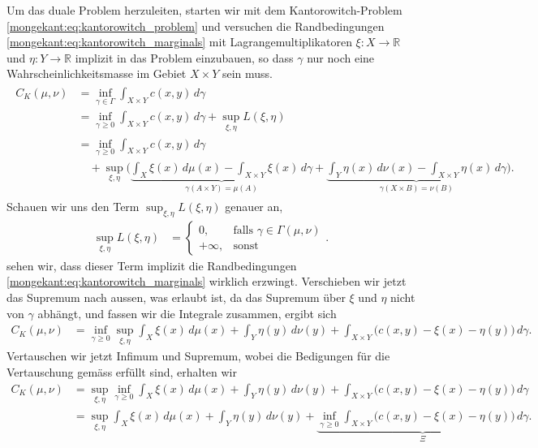 Um das duale Problem herzuleiten,
starten wir mit dem Kantorowitch-Problem \eqref{mongekant:eq:kantorowitch_problem}
und versuchen die Randbedingungen \eqref{mongekant:eq:kantorowitch_marginals}
mit Lagrangemultiplikatoren $\xi \colon X \to \mathbb{R}$ und
$\eta \colon Y \to \mathbb{R}$ implizit in das Problem einzubauen,
so dass $\gamma$ nur noch eine Wahrscheinlichkeitsmasse im Gebiet $X\times Y$ sein muss.
\begin{align*}
\begin{aligned}
C_K(\mu, \nu)
&=
\inf_{\gamma \in \Gamma} \int_{X \times Y} c(x,y)\, d\gamma
\\
&=
\inf_{\gamma \geq 0} \int_{X \times Y} c(x,y)\, d\gamma
+ \sup_{\xi, \eta} L(\xi, \eta)
\\
&=
\inf_{\gamma \geq 0} \int_{X \times Y} c(x,y)\, d\gamma
\\
&\quad
+ \sup_{\xi, \eta} \Biggl(
\underbrace{
\int_X \xi(x)\, d\mu(x) - \int_{X \times Y} \xi(x)\, d\gamma
}_{\gamma(A \times Y) = \mu(A)}
+ \underbrace{
\int_Y \eta(x)\, d\nu(x) - \int_{X \times Y} \eta(x)\, d\gamma
}_{\gamma(X \times B) = \nu(B)}
\Biggr)
.
\end{aligned}
\end{align*}
Schauen wir uns den Term $\sup_{\xi, \eta} L(\xi, \eta)$ genauer an,
\begin{align*}
\sup_{\xi, \eta} L(\xi, \eta)
&=
\begin{cases}
0,
& \text{falls } \gamma \in \Gamma(\mu, \nu) \\
+\infty,
& \text{sonst}
\end{cases}
.
\end{align*}
sehen wir,
dass dieser Term implizit die Randbedingungen
\eqref{mongekant:eq:kantorowitch_marginals} wirklich erzwingt.
Verschieben wir jetzt das Supremum nach aussen,
was erlaubt ist,
da das Supremum über $\xi$ und $\eta$ nicht von $\gamma$ abhängt,
und fassen wir die Integrale zusammen,
ergibt sich
\begin{align*}
C_K(\mu, \nu)
&=
\inf_{\gamma \geq 0}
\sup_{\xi, \eta}
\int_X \xi(x)\, d\mu(x)
+ \int_Y \eta(y)\, d\nu(y)
+ \int_{X \times Y} \bigl(c(x,y) - \xi(x) - \eta(y)\bigr)\, d\gamma
.
\end{align*}
Vertauschen wir jetzt Infimum und Supremum,
wobei die Bedigungen für die Vertauschung gemäss \cite{mongekant:villani} erfüllt sind,
erhalten wir
\begin{align*}
C_K(\mu, \nu)
&=
\sup_{\xi, \eta}
\inf_{\gamma \geq 0} \int_X \xi(x)\, d\mu(x)
+ \int_Y \eta(y)\, d\nu(y)
+ \int_{X \times Y} \bigl(c(x,y) - \xi(x) - \eta(y)\bigr)\, d\gamma
\\
&=
\sup_{\xi, \eta} \int_X \xi(x)\, d\mu(x)
+ \int_Y \eta(y)\, d\nu(y)
+ \underbrace{
\inf_{\gamma \geq 0} \int_{X \times Y} \bigl(c(x,y) - \xi(x) - \eta(y)\bigr)\, d\gamma
}_{\Xi}
.
\end{align*}
